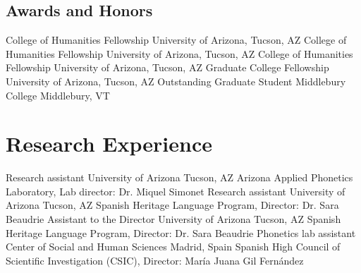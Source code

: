 \documentclass[11pt,letterpaper]{moderncv}
\begin{document}
\subsection{Awards and Honors}

        {College of Humanities Fellowship}
        {}
        {}
        {}
        {University of Arizona, Tucson, AZ}
        {College of Humanities Fellowship}
        {}
        {}
        {}
        {University of Arizona, Tucson, AZ}
        {College of Humanities Fellowship}
        {}
        {}
        {}
        {University of Arizona, Tucson, AZ}
        {Graduate College Fellowship}
        {}
        {}
        {}
        {University of Arizona, Tucson, AZ}
        {Outstanding Graduate Student}
        {Middlebury College}
        {Middlebury, VT}
        {}
        {}
        {}








\section{Research Experience}

        {Research assistant}
        {University of Arizona}
        {Tucson, AZ}
        {}
        {Arizona Applied Phonetics Laboratory, Lab director: Dr. Miquel Simonet}
        {Research assistant}
        {University of Arizona}
        {Tucson, AZ}
        {}
        {Spanish Heritage Language Program, Director: Dr. Sara Beaudrie}
        {Assistant to the Director}
        {University of Arizona}
        {Tucson, AZ}
        {}
        {Spanish Heritage Language Program, Director: Dr. Sara Beaudrie}
        {Phonetics lab assistant}
        {Center of Social and Human Sciences}
        {Madrid, Spain}
        {}
        {Spanish High Council of Scientific Investigation (CSIC), Director: Mar\'ia Juana Gil Fern\'andez}
\end{document}
